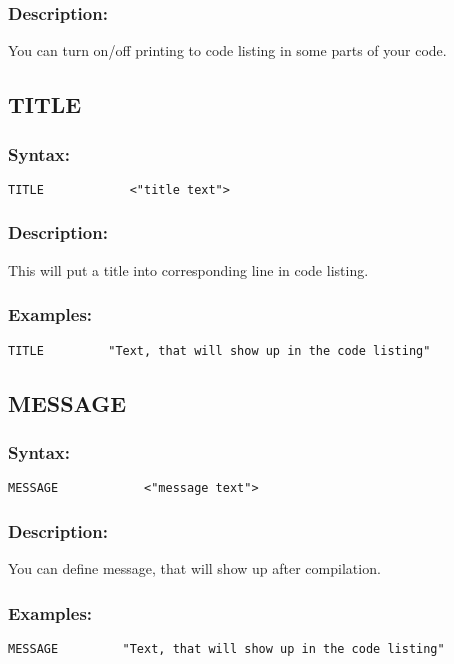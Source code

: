         \subsubsection{Description:}
            You can turn on/off printing to code listing in some parts of your code.

    \subsection{TITLE}
        \subsubsection{Syntax:}
            \verb'TITLE            <"title text">'

        \subsubsection{Description:}
        This will put a title into corresponding line in code listing.

        \subsubsection{Examples:}
        {
            \usecodefont
            \verb'TITLE         "Text, that will show up in the code listing"'
        }

    \subsection{MESSAGE}
        \subsubsection{Syntax:}
            \verb'MESSAGE            <"message text">'

        \subsubsection{Description:}
            You can define message, that will show up after compilation.

        \subsubsection{Examples:}
        {
            \usecodefont
            \verb'MESSAGE         "Text, that will show up in the code listing"'
        }

